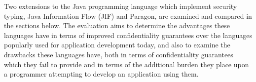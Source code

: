 Two extensions to the Java programming language which implement security typing, Java Information Flow (JIF) and Paragon, are examined and compared in the sections below. The evaluation aims to determine the advantages these languages have in terms of improved confidentiality guarantees over the languages popularly used for application development today, and also to examine the drawbacks these languages have, both in terms of confidentiality guarantees which they fail to provide and in terms of the additional burden they place upon a programmer attempting to develop an application using them.